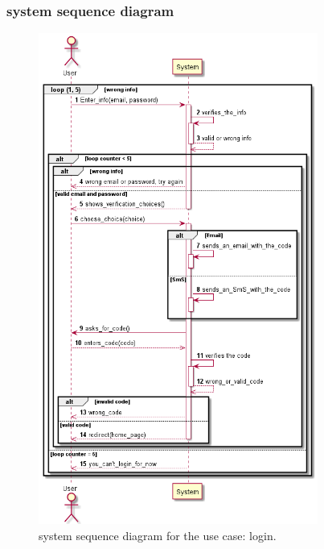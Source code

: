 \documentclass[]{uc2pfecaneva}
\begin{document}
    \subsubsection{system sequence diagram}
    \begin{figure}[h]

        \centering
        \includegraphics[width=260pt]{images/Login_dss}

        \caption{system sequence diagram for the use case: login.}
    \end{figure}
    \clearpage
\end{document}

